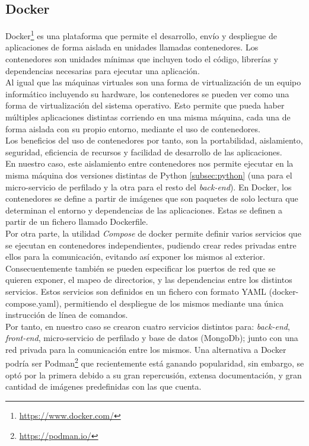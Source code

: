 \subsection{Docker}
Docker\footnote{\url{https://www.docker.com/}} es una plataforma que permite el desarrollo, envío y despliegue de aplicaciones de forma aislada en unidades llamadas contenedores. Los contenedores son unidades mínimas que incluyen todo el código, librerías y dependencias necesarias para ejecutar una aplicación.\\
Al igual que las máquinas virtuales son una forma de virtualización de un equipo informático incluyendo su hardware, los contenedores se pueden ver como una forma de virtualización del sistema operativo. Esto permite que pueda haber múltiples aplicaciones distintas corriendo en una misma máquina, cada una de forma aislada con su propio entorno, mediante el uso de contenedores.\\
Los beneficios del uso de contenedores por tanto, son la portabilidad, aislamiento, seguridad, eficiencia de recursos y facilidad de desarrollo de las aplicaciones.\\
En nuestro caso, este aislamiento entre contenedores nos permite ejecutar en la misma máquina dos versiones distintas de Python \ref{subsec:python} (una para el micro-servicio de perfilado y la otra para el resto del \textit{back-end}).
En Docker, los contenedores se define a partir de imágenes que son paquetes de solo lectura que determinan el entorno y dependencias de las aplicaciones. Estas se definen a partir de un fichero llamado Dockerfile.\\
Por otra parte, la utilidad \textit{Compose} de docker permite definir varios servicios que se ejecutan en contenedores independientes, pudiendo crear redes privadas entre ellos para la comunicación, evitando así exponer los mismos al exterior. Consecuentemente también se pueden especificar los puertos de red que se quieren exponer, el mapeo de directorios, y las dependencias entre los distintos servicios. Estos servicios son definidos en un fichero con formato YAML (docker-compose.yaml), permitiendo el despliegue de los mismos mediante una única instrucción de línea de comandos.\\
Por tanto, en nuestro caso se crearon cuatro servicios distintos para: \textit{back-end}, \textit{front-end}, micro-servicio de perfilado y base de datos (MongoDb); junto con una red privada para la comunicación entre los mismos.
Una alternativa a Docker podría ser Podman\footnote{\url{https://podman.io/}} que recientemente está ganando popularidad, sin embargo, se optó por la primera debido a su gran repercusión, extensa documentación, y gran cantidad de imágenes predefinidas con las que cuenta.
